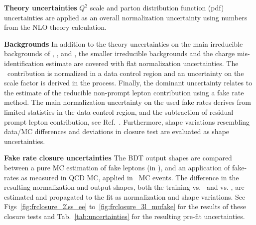 \textbf{Theory uncertainties}
$Q^2$ scale and parton distribution function (pdf) uncertainties are applied as an overall normalization uncertainty using numbers from the NLO theory calculation.

\textbf{Backgrounds}
In addition to the theory uncertainties on the main irreducible backgrounds of \ttW, \ttZ, and \ttH, the smaller irreducible backgrounds and the charge mis-identification estimate are covered with flat normalization uncertainties.
The \WZ\ contribution is normalized in a data control region and an uncertainty on the scale factor is derived in the process.
Finally, the dominant uncertainty relates to the estimate of the reducible non-prompt lepton contribution using a fake rate method.
The main normalization uncertainty on the used fake rates derives from limited statistics in the data control region, and the subtraction of residual prompt lepton contribution, see Ref.~\cite{CMS_AN_2017-029}.
Furthermore, shape variations resembling data/MC differences and deviations in closure test are evaluated as shape uncertainties.

\textbf{Fake rate closure uncertainties}
The BDT output shapes are compared between a pure MC estimation of fake leptons (in \ttbar), and an application of fake-rates as measured in QCD MC, applied in \ttbar\ MC events.
The difference in the resulting normalization and output shapes, both the training vs. \ttbar\ and vs. \ttV, are estimated and propagated to the fit as normalization and shape variations.
See Figs~\ref{fig:frclosure_2lss_ee} to~\ref{fig:frclosure_3l_mufake} for the results of these closure tests and Tab.~\ref{tab:uncertainties} for the resulting pre-fit uncertainties.


